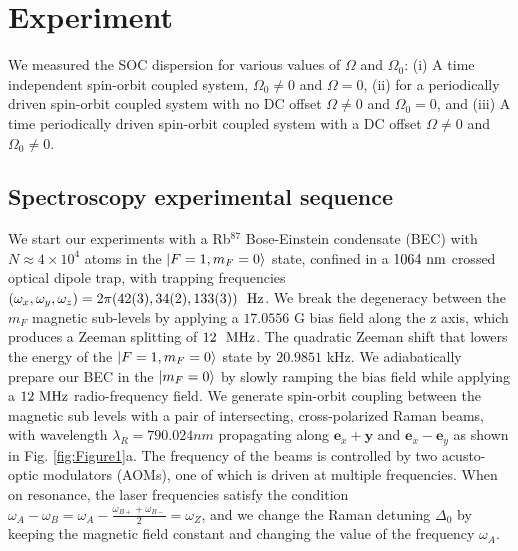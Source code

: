 \section{Experiment}

We measured the SOC dispersion for various values of $\Omega$ and $\Omega_0$: (i) A time independent spin-orbit coupled system, $\Omega_0\neq0$ and $\Omega=0$, (ii) for a periodically driven spin-orbit coupled system with no DC offset $\Omega\neq0$ and $\Omega_0=0$, and (iii) A time periodically driven spin-orbit coupled system with a DC offset $\Omega\neq0$ and $\Omega_0\neq0$. 

\subsection{Spectroscopy experimental sequence}


We start our experiments with a Rb$^{87}$ Bose-Einstein condensate \cite{lin_rapid_2009} (BEC) with $N\approx 4\times 10^4$ atoms in the $|F=1,m_F=0\rangle$ state, confined in a $1064{\ {\rm nm}}$ crossed optical dipole trap, with trapping frequencies $(\omega_x,\omega_y,\omega_z)=2\pi(42(3),34(2),133(3))\ \Hz$. We break the degeneracy between the $m_F$ magnetic sub-levels by applying a $17.0556$ G bias field along the z axis, which produces a Zeeman splitting of $12 \ {\ {\rm MHz}}$. The quadratic Zeeman shift that lowers the energy of the $|F=1,m_F=0\rangle$ state  by $20.9851$ kHz. We adiabatically prepare our BEC in the $|m_F=0\rangle$ by slowly ramping the bias field while applying a $12{\ {\rm MHz}}$ radio-frequency field. We generate spin-orbit coupling between the magnetic sub levels with a pair of intersecting, cross-polarized Raman beams, with wavelength $\lambda_R=790.024 nm$ propagating along $\mathbf{e}_x+\mathbf{y}$ and $\mathbf{e}_x-\mathbf{e}_y$ as shown in Fig. \ref{fig:Figure1}a. The frequency of the beams is controlled by two acusto-optic modulators (AOMs), one of which is driven at multiple frequencies. When on resonance, the laser frequencies satisfy the condition $\omega_A-\omega_B=\omega_A-\frac{\omega_{B+}+\omega_{B-}}{2}=\omega_Z$, and we change the Raman detuning $\Delta_0$ by keeping the magnetic field constant and changing the value of the frequency $\omega_A$.

